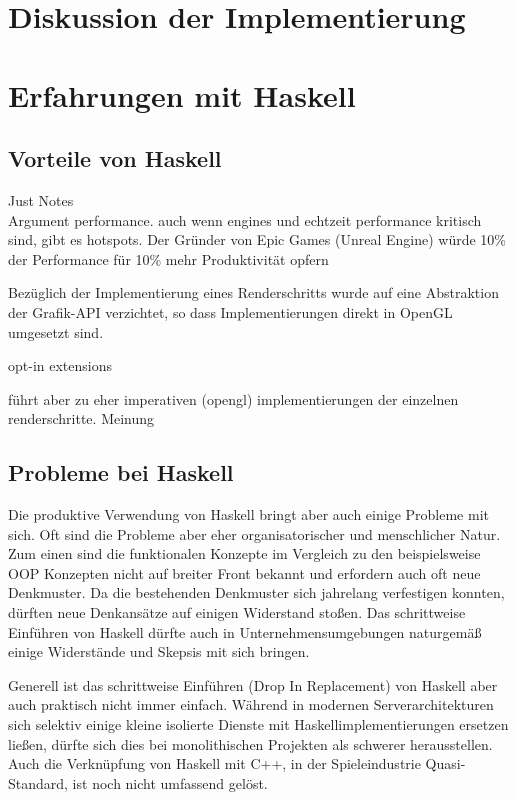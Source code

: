\section{Diskussion der Implementierung}\label{sec:diskussion-impl}

\section{Erfahrungen mit Haskell}\label{sec:xp-haskell}

\subsection{Vorteile von Haskell}

{\Huge Just Notes}\\
Argument performance. auch wenn engines und echtzeit performance kritisch sind, gibt es hotspots.
Der Gründer von Epic Games (Unreal Engine) würde 10\% der Performance für 10\% mehr Produktivität opfern \parencite[Seite 20]{Sweeney2006} %

Bezüglich der Implementierung eines Renderschritts wurde auf eine Abstraktion der Grafik-API verzichtet, so dass Implementierungen direkt in OpenGL umgesetzt sind.

opt-in extensions

führt aber zu eher imperativen (opengl) implementierungen der einzelnen renderschritte. Meinung

\subsection{Probleme bei Haskell}\label{sec:probleme-haskell}

Die produktive Verwendung von Haskell bringt aber auch einige Probleme mit sich. Oft sind die Probleme aber eher organisatorischer und menschlicher Natur. Zum einen sind die funktionalen Konzepte im Vergleich zu den beispielsweise OOP Konzepten nicht auf breiter Front bekannt und erfordern auch oft neue Denkmuster. Da die bestehenden Denkmuster sich jahrelang verfestigen konnten, dürften neue Denkansätze auf einigen Widerstand stoßen. Das schrittweise Einführen von Haskell dürfte auch in Unternehmensumgebungen naturgemäß einige Widerstände und Skepsis mit sich bringen.

Generell ist das schrittweise Einführen (Drop In Replacement) von Haskell aber auch praktisch nicht immer einfach. Während in modernen Serverarchitekturen sich selektiv einige kleine isolierte Dienste mit Haskellimplementierungen ersetzen ließen, dürfte sich dies bei monolithischen Projekten als schwerer herausstellen. Auch die Verknüpfung von Haskell mit C++, in der Spieleindustrie Quasi-Standard, ist noch nicht umfassend gelöst.

